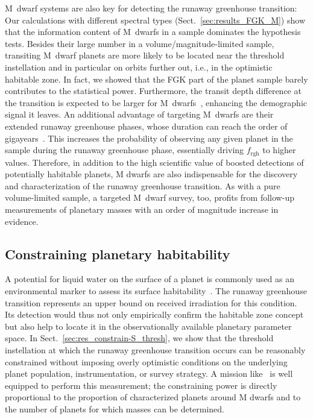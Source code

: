 \documentclass[twocolumn,twocolappendix]{aastex631}
\begin{document}
M~dwarf systems are also key for detecting the runaway greenhouse transition:
Our calculations with different spectral types (Sect.~\ref{sec:results_FGK_M}) show that the information content of M~dwarfs in a sample dominates the hypothesis tests.
Besides their large number in a volume/magnitude-limited sample, transiting M~dwarf planets are more likely to be located near the threshold instellation and in particular on orbits further out, i.e., in the optimistic habitable zone.
In fact, we showed that the FGK part of the planet sample barely contributes to the statistical power.
Furthermore, the transit depth difference at the transition is expected to be larger for M~dwarfs~\citep[$\sim \SI{100}{\ppm}$ for early, $\sim \SI{1000}{\ppm}$ for late M~stars,][]{Turbet2019}, enhancing the demographic signal it leaves.
An additional advantage of targeting M~dwarfs are their extended runaway greenhouse phases, whose duration can reach the order of gigayears~\citep{Luger2015}.
This increases the probability of observing any given planet in the sample during the runaway greenhouse phase, essentially driving $f_\mathrm{rgh}$ to higher values.
Therefore, in addition to the high scientific value of boosted detections of potentially habitable planets, M dwarfs are also indispensable for the discovery and characterization of the runaway greenhouse transition.
As with a pure volume-limited sample, a targeted M~dwarf survey, too, profits from follow-up measurements of planetary masses with an order of magnitude increase in evidence.


\subsection{Constraining planetary habitability}\label{sec:habitability}
A potential for liquid water on the surface of a planet is commonly used as an environmental marker to assess its surface habitability~\citep{Huang1959,Hart1978,Kasting1993,Kaltenegger2011,Kopparapu2013}.
The runaway greenhouse transition represents an upper bound on received irradiation for this condition.
Its detection would thus not only empirically confirm the habitable zone concept but also help to locate it in the observationally available planetary parameter space.
In Sect.~\ref{sec:res_constrain-S_thresh}, we show that the threshold instellation at which the runaway greenhouse transition occurs can be reasonably constrained without imposing overly optimistic conditions on the underlying planet population, instrumentation, or survey strategy.
A mission like \plato\ is well equipped to perform this measurement; the constraining power is directly proportional to the proportion of characterized planets around M dwarfs and to the number of planets for which masses can be determined.
\end{document}
